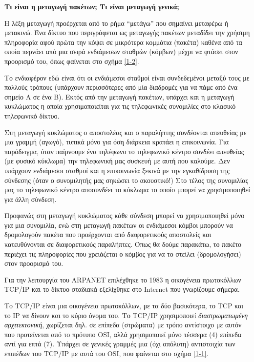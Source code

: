 \begin{inthebox}
\textbf{Τι είναι η μεταγωγή πακέτων; Τι είναι μεταγωγή γενικά;}

Η λέξη μεταγωγή προέρχεται από το ρήμα ``μετάγω'' που σημαίνει μεταφέρω ή μετακινώ.
Ένα δίκτυο που περιγράφεται ως μεταγωγής πακέτων μεταδίδει την χρήσιμη πληροφορία αφού πρώτα
την κόψει σε μικρότερα κομμάτια (πακέτα) καθένα από τα οποία περνάει από μια σειρά ενδιάμεσων σταθμών
(κόμβων) μέχρι να φτάσει στον προορισμό του, όπως φαίνεται στο σχήμα \ref{1-2}.

Το ενδιαφέρον εδώ είναι ότι οι ενδιάμεσοι σταθμοί είναι συνδεδεμένοι μεταξύ τους
με πολλούς τρόπους (υπάρχουν περισσότερες από μία διαδρομές για να πάμε από
ένα σημείο Α σε ένα Β). Εκτός από την μεταγωγή πακέτων, υπάρχει και η μεταγωγή
κυκλώματος η οποία χρησιμοποιείται για τις τηλεφωνικές συνομιλίες στο κλασικό
τηλεφωνικό δίκτυο.

Στη μεταγωγή κυκλώματος ο αποστολέας και ο παραλήπτης συνδέονται απευθείας με
μια γραμμή (αγωγό), τυπικά μόνο για όση διάρκεια κρατάει η επικοινωνία. Για
παράδειγμα, όταν παίρνουμε ένα τηλέφωνο το τηλεφωνικό κέντρο συνδέει απευθείας
(με φυσικό κύκλωμα) την τηλεφωνική μας συσκευή με αυτή που καλούμε. Δεν
υπάρχουν ενδιάμεσοι σταθμοί και η επικοινωνία ξεκινά με την εγκαθίδρυση της
σύνδεσης (όταν ο συνομιλητής μας σηκώσει το ακουστικό!) Στο τέλος της
συνομιλίας μας το τηλεφωνικό κέντρο αποσυνδέει το κύκλωμα το οποίο μπορεί να
χρησιμοποιηθεί για άλλη σύνδεση.

Προφανώς στη μεταγωγή κυκλώματος κάθε σύνδεση μπορεί να χρησιμοποιηθεί μόνο
για μια συνομιλία, ενώ στη μεταγωγή πακέτων οι ενδιάμεσοι κόμβοι μπορούν να
δρομολογούν πακέτα που προέρχονται από διαφορετικούς αποστολείς και
κατευθύνονται σε διαφορετικούς παραλήπτες. Όπως θα δούμε παρακάτω, το πακέτο
περιέχει τις πληροφορίες που χρειάζεται ο κόμβος για να το στείλει (δρομολογήσει) στον
προορισμό του.\\
\end{inthebox}

Για την λειτουργία του ARPANET επιλέχθηκε το 1983 η οικογένεια πρωτοκόλλων
TCP/IP και το δίκτυο σταδιακά εξελίχθηκε στο Internet που γνωρίζουμε σήμερα.

Το TCP/IP είναι μια οικογένεια πρωτοκόλλων, με τα δύο βασικότερα, το TCP και το
IP να δίνουν και το κύριο όνομα του. Το TCP/IP χρησιμοποιεί \emph{διαστρωματωμένη
αρχιτεκτονική}, χωρίζεται δηλ. σε επίπεδα (στρώματα) με τρόπο αντίστοιχο με
αυτόν που προτείνεται από το πρότυπο OSI, αλλά χρησιμοποιεί μόνο τέσσερα (4)
επίπεδα αντί για επτά (7). Υπάρχει σε γενικές γραμμές μια (όχι απόλυτη) αντιστοιχία
των επιπέδων του TCP/IP με αυτά του OSI, που φαίνεται στο σχήμα \ref{1-1}.

